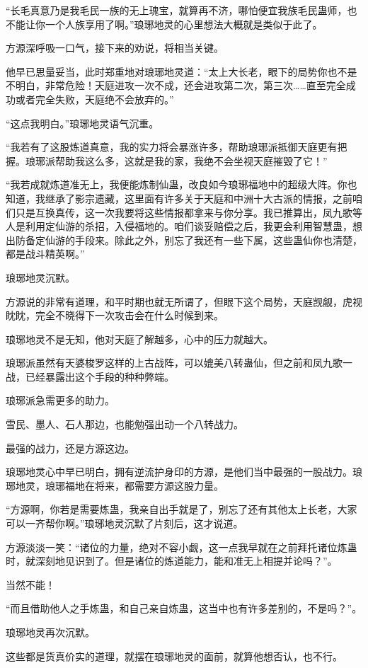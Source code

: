 \begin{this_body}
“长毛真意乃是我毛民一族的无上瑰宝，就算再不济，哪怕便宜我族毛民蛊师，也不能让你一个人族享用了啊。”琅琊地灵的心里想法大概就是类似于此了。

方源深呼吸一口气，接下来的劝说，将相当关键。

他早已思量妥当，此时郑重地对琅琊地灵道：“太上大长老，眼下的局势你也不是不明白，非常危险！天庭进攻一次不成，还会进攻第二次，第三次……直至完全成功或者完全失败，天庭绝不会放弃的。”

“这点我明白。”琅琊地灵语气沉重。

“我若有了这股炼道真意，我的实力将会暴涨许多，帮助琅琊派抵御天庭更有把握。琅琊派帮助我这么多，这就是我的家，我绝不会坐视天庭摧毁了它！”

“我若成就炼道准无上，我便能炼制仙蛊，改良如今琅琊福地中的超级大阵。你也知道，我继承了影宗遗藏，这里面有许多关于天庭和中洲十大古派的情报，之前咱们只是互换真传，这一次我要将这些情报都拿来与你分享。我已推算出，凤九歌等人是利用定仙游的杀招，入侵福地的。咱们谈妥赔偿之后，我更会利用智慧蛊，想出防备定仙游的手段来。除此之外，别忘了我还有一些下属，这些蛊仙你也清楚，都是战斗精英啊。”

琅琊地灵沉默。

方源说的非常有道理，和平时期也就无所谓了，但眼下这个局势，天庭觊觎，虎视眈眈，完全不晓得下一次攻击会在什么时候到来。

琅琊地灵不是无知，他对天庭了解越多，心中的压力就越大。

琅琊派虽然有天婆梭罗这样的上古战阵，可以媲美八转蛊仙，但之前和凤九歌一战，已经暴露出这个手段的种种弊端。

琅琊派急需更多的助力。

雪民、墨人、石人那边，也能勉强出动一个八转战力。

最强的战力，还是方源这边。

琅琊地灵心中早已明白，拥有逆流护身印的方源，是他们当中最强的一股战力。琅琊地灵，琅琊福地在将来，都需要方源这股力量。

“方源啊，你若是需要炼蛊，我亲自出手就是了，别忘了还有其他太上长老，大家可以一齐帮你啊。”琅琊地灵沉默了片刻后，这才说道。

方源淡淡一笑：“诸位的力量，绝对不容小觑，这一点我早就在之前拜托诸位炼蛊时，就深刻地见识到了。但是诸位的炼道能力，能和准无上相提并论吗？”。

当然不能！

“而且借助他人之手炼蛊，和自己亲自炼蛊，这当中也有许多差别的，不是吗？”。

琅琊地灵再次沉默。

这些都是货真价实的道理，就摆在琅琊地灵的面前，就算他想否认，也不行。


\end{this_body}
